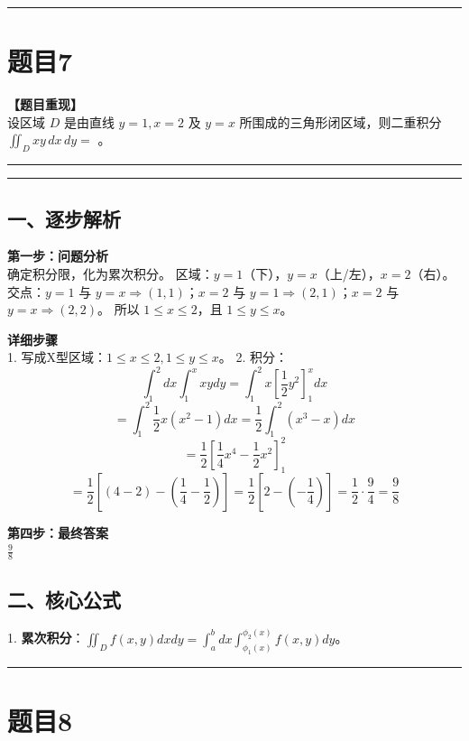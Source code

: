 \documentclass[12pt, a4paper]{ctexart}
\newcommand{\TopSeparator}{
    \par\noindent\rule{\textwidth}{1.5pt}\vspace{0.5em} %
}
\newcommand{\AnalysisSeparator}{
    \par\noindent\rule{\textwidth}{0.5pt}\vspace{0.2em}\hrule\vspace{0.5em} %
}
\newenvironment{RedAnalysis}{
    \par
    \color{red} %
}{
    \par
    \color{black} %
}
\begin{document}
\TopSeparator
\section*{题目7}

\textbf{【题目重现】} \\
设区域 $D$ 是由直线 $y = 1, x = 2$ 及 $y = x$ 所围成的三角形闭区域，则二重积分 $ \iint_{D} xy \, dx \, dy = $ \underline{\hspace{2cm}}。

\AnalysisSeparator

\begin{RedAnalysis}

\subsection*{一、逐步解析}

\textbf{第一步：问题分析} \\
确定积分限，化为累次积分。
区域：$y=1$（下），$y=x$（上/左），$x=2$（右）。
交点：$y=1$ 与 $y=x \Rightarrow (1,1)$；$x=2$ 与 $y=1 \Rightarrow (2,1)$；$x=2$ 与 $y=x \Rightarrow (2,2)$。
所以 $1 \le x \le 2$，且 $1 \le y \le x$。

\textbf{详细步骤} \\
1. 写成X型区域：$1 \le x \le 2, 1 \le y \le x$。
2. 积分：
   \[ \int_1^2 dx \int_1^x xy dy = \int_1^2 x [\frac{1}{2}y^2]_1^x dx \]
   \[ = \int_1^2 \frac{1}{2}x (x^2 - 1) dx = \frac{1}{2} \int_1^2 (x^3 - x) dx \]
   \[ = \frac{1}{2} [\frac{1}{4}x^4 - \frac{1}{2}x^2]_1^2 \]
   \[ = \frac{1}{2} [ (4 - 2) - (\frac{1}{4} - \frac{1}{2}) ] = \frac{1}{2} [ 2 - (-\frac{1}{4}) ] = \frac{1}{2} \cdot \frac{9}{4} = \frac{9}{8} \]

\textbf{第四步：最终答案} \\
$ \frac{9}{8} $

\subsection*{二、核心公式}
1. \textbf{累次积分}：$\iint_D f(x,y) dxdy = \int_a^b dx \int_{\phi_1(x)}^{\phi_2(x)} f(x,y) dy$。

\end{RedAnalysis}

\vspace{2em}

\TopSeparator
\section*{题目8}
\end{document}
